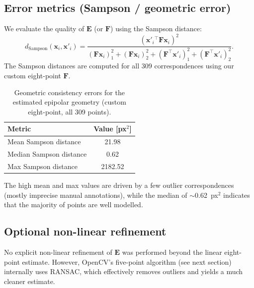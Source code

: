 \documentclass{article}
\begin{document}

\subsection{Error metrics (Sampson / geometric error)}
We evaluate the quality of $\mathbf{E}$ (or $\mathbf{F}$) using the Sampson distance:
\[
d_{\mathrm{Sampson}}(\mathbf{x}_i,\mathbf{x}'_i)=
\frac{(\mathbf{x}'_i{}^\top\mathbf{F}\mathbf{x}_i)^2}{
(\mathbf{F}\mathbf{x}_i)_1^2+(\mathbf{F}\mathbf{x}_i)_2^2+(\mathbf{F}^\top\mathbf{x}'_i)_1^2+(\mathbf{F}^\top\mathbf{x}'_i)_2^2}.
\]
The Sampson distances are computed for all 309 correspondences using our custom eight-point $\mathbf{F}$.

\begin{table}[h]
\centering
\begin{tabular}{l c}
\toprule
Metric & Value [px$^2$] \\
\midrule
Mean Sampson distance & 21.98 \\
Median Sampson distance & 0.62 \\
Max Sampson distance & 2182.52 \\
\bottomrule
\end{tabular}
\caption{Geometric consistency errors for the estimated epipolar geometry (custom eight-point, all 309 points).}
\label{tab:sampson}
\end{table}

The high mean and max values are driven by a few outlier correspondences (mostly imprecise manual annotations), while the median of $\sim$0.62~px$^2$ indicates that the majority of points are well modelled.

\subsection{Optional non-linear refinement}
No explicit non-linear refinement of $\mathbf{E}$ was performed beyond the linear eight-point estimate. However, OpenCV's five-point algorithm (see next section) internally uses RANSAC, which effectively removes outliers and yields a much cleaner estimate.
\end{document}
